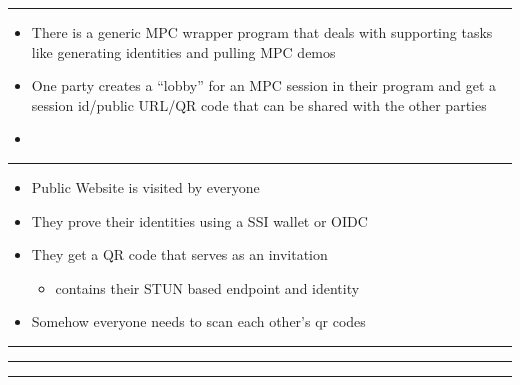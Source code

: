 \begin{center}\rule{0.5\linewidth}{0.5pt}\end{center}

\begin{itemize}
\tightlist
\item
  There is a generic MPC wrapper program that deals with supporting tasks like generating identities and pulling MPC demos
\item
  One party creates a ``lobby'' for an MPC session in their program and get a session id/public URL/QR code that can be shared with the other parties
\item
\end{itemize}

\begin{center}\rule{0.5\linewidth}{0.5pt}\end{center}

\begin{itemize}
\tightlist
\item
  Public Website is visited by everyone
\item
  They prove their identities using a SSI wallet or OIDC
\item
  They get a QR code that serves as an invitation

  \begin{itemize}
  \tightlist
  \item
    contains their STUN based endpoint and identity
  \end{itemize}
\item
  Somehow everyone needs to scan each other's qr codes
\end{itemize}

\begin{center}\rule{0.5\linewidth}{0.5pt}\end{center}

\begin{center}\rule{0.5\linewidth}{0.5pt}\end{center}

\begin{center}\rule{0.5\linewidth}{0.5pt}\end{center}

